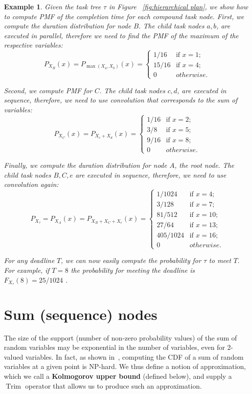 \documentclass[review]{elsarticle}
\newtheorem{example}{Example}
\DeclareMathOperator{\Trim}{Trim}
\begin{document}
\begin{example}

Given the task tree $\tau$ in Figure ~\ref{fig:hierarchical plan}, we show how to compute PMF of the completion time for each compound task node. 
First, we compute the duration distribution for node $B$. The child task nodes $a,b$, are executed in parallel, therefore we need to find the PMF of the maximum of the respective variables:
$$P_{X_B}(x)=P_{\max(X_a,X_b)}(x)=
\begin{cases}
1/16 & \text{if } x=1; \\
15/16 & \text{if } x=4; \\
0 & otherwise.
\end{cases}$$

Second, we compute PMF for $C$. The child task nodes $c,d$, are executed in sequence, therefore, we need to use convolution that corresponds to the sum of variables:
$$P_{X_C}(x)=P_{X_c+X_d}(x)=
\begin{cases}
1/16 & \text{if } x=2; \\
3/8 & \text{if } x=5; \\
9/16 & \text{if } x=8; \\
0 & otherwise.
\end{cases}$$

Finally, we compute the duration distribution for node $A$, the root node. The child task nodes $B,C,e$ are executed in sequence, therefore, we need to use convolution again:
$$P_{X_{\tau}}=P_{X_A}(x)=P_{X_B+X_C+X_e}(x)=
\begin{cases}
1/1024 & \text{if } x=4; \\
3/128 & \text{if } x=7; \\
81/512 & \text{if } x=10; \\
27/64 & \text{if } x=13; \\
405/1024 & \text{if } x=16; \\
0 & otherwise.
\end{cases}$$

For any deadline $T$, we can now easily compute the probability for $\tau$ to meet $T$. For example, if $T=8$ the probability for meeting the deadline is $F_{X_{\tau}}(8)=25/1024$ . 
\end{example}
 
\section{Sum (sequence) nodes}\label{sec:seq}

The size of the support (number of non-zero probability values) of the sum of random variables
may be exponential in the number of variables, even for 2-valued variables.
In fact, as shown in~\cite{mohring2001scheduling}, computing the CDF of a sum of random variables at a given point is NP-hard.
We thus define a notion of approximation, 
which we call a {\bf Kolmogorov upper bound} (defined below), and 
supply a $\Trim$ operator that allows us to produce such an approximation.
\end{document}
